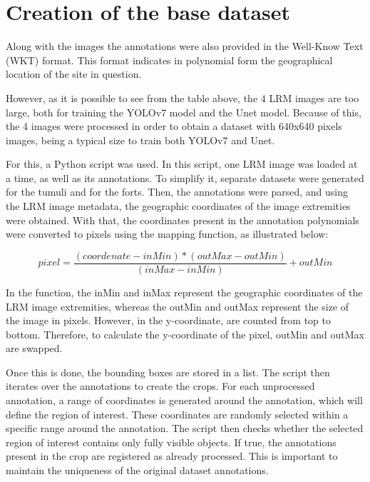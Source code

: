 \section{Creation of the base dataset}

Along with the images the annotations were also provided in the Well-Know Text (WKT) format. This format indicates in polynomial form the geographical location of the site in question.

However, as it is possible to see from the table above, the 4 LRM images are too large, both for training the YOLOv7 model and the Unet model. Because of this, the 4 images were processed in order to obtain a dataset with 640x640 pixels images, being a typical size to train both YOLOv7 and Unet.

For this, a Python script was used. In this script, one LRM image was loaded at a time, as well as its annotations. To simplify it, separate datasets were generated for the tumuli and for the forts. Then, the annotations were parsed, and using the LRM image metadata, the geographic coordinates of the image extremities were obtained. With that, the coordinates present in the annotation polynomials were converted to pixels using the mapping function, as illustrated below:

\begin{equation}
     pixel = \frac{(coordenate - inMin) * (outMax - outMin)} {(inMax - inMin)} + outMin
     \label{Map function}
\end{equation}

In the function, the inMin and inMax represent the geographic coordinates of the LRM image extremities, whereas the outMin and outMax represent the size of the image in pixels. However, in the y-coordinate, are counted from top to bottom. Therefore, to calculate the y-coordinate of the pixel, outMin and outMax are swapped.

Once this is done, the bounding boxes are stored in a list. The script then iterates over the annotations to create the crops. For each unprocessed annotation, a range of coordinates is generated around the annotation, which will define the region of interest. These coordinates are randomly selected within a specific range around the annotation. The script then checks whether the selected region of interest contains only fully visible objects. If true, the annotations present in the crop are registered as already processed. This is important to maintain the uniqueness of the original dataset annotations. 

